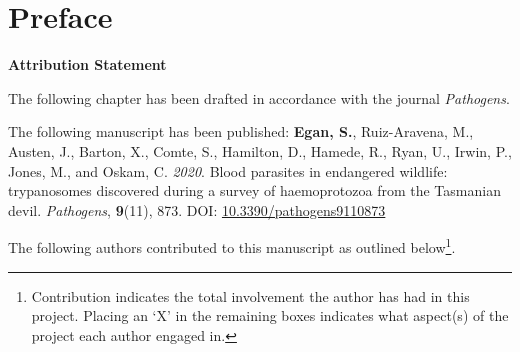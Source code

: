 \documentclass[a4paper, nobind]{templates/ociamthesis}
\begin{document}
\newpage

\hypertarget{preface-5}{%
\section*{Preface}\label{preface-5}}

\textbf{Attribution Statement}

The following chapter has been drafted in accordance with the journal \emph{Pathogens}.

The following manuscript has been published: \textbf{Egan, S.}, Ruiz-Aravena, M., Austen, J., Barton, X., Comte, S., Hamilton, D., Hamede, R., Ryan, U., Irwin, P., Jones, M., and Oskam, C. \emph{2020}. Blood parasites in endangered wildlife: trypanosomes discovered during a survey of haemoprotozoa from the Tasmanian devil. \emph{Pathogens}, \textbf{9}(11), 873. DOI: \href{https://doi.org/10.3390/pathogens9110873}{10.3390/pathogens9110873}

The following authors contributed to this manuscript as outlined below\footnote{Contribution indicates the total involvement the author has had in this project. Placing an `X' in the remaining boxes indicates what aspect(s) of the project each author engaged in.}.
\end{document}
